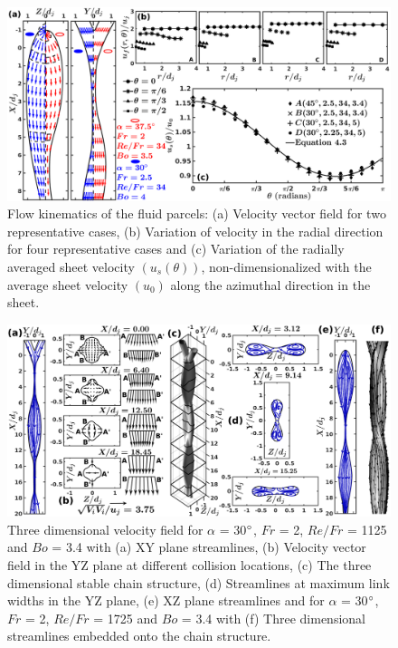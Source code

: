 \documentclass{jfm}
\begin{document}
\begin{figure}
	\centering
	\includegraphics[width=\linewidth]{Figure4}
	\caption{Flow kinematics of the fluid parcels: (a) Velocity vector field for two representative cases, (b) Variation of velocity in the radial direction for four representative cases and (c) Variation of the radially averaged sheet velocity $\left(u_s(\theta)\right)$, non-dimensionalized with the average sheet velocity $\left(u_0\right)$ along the azimuthal direction in the sheet.}
	\label{Figure::velocityVectors}
\end{figure}
\begin{figure}
	\centering
	\includegraphics[width=\linewidth]{Figure5}
	\caption{Three dimensional velocity field for $\alpha$ = 30$\degree$, $Fr$ = 2,  $Re/Fr$ = 1125 and $Bo$ = 3.4 with (a) XY plane streamlines, (b) Velocity vector field in the YZ plane at different collision locations, (c) The three dimensional stable chain structure, (d) Streamlines at maximum link widths in the YZ plane, (e) XZ plane streamlines and for $\alpha$ = 30$\degree$, $Fr$ = 2,  $Re/Fr$ = 1725 and $Bo$ = 3.4 with (f) Three dimensional streamlines embedded onto the chain structure.}
	\label{Figure::streamDetails}
\end{figure}
\end{document}
